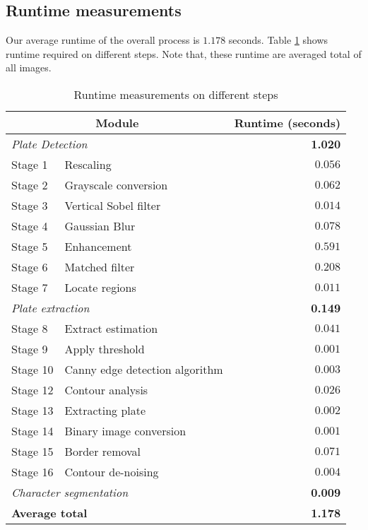 
\subsection{Runtime measurements}
Our average runtime of the overall process is $1.178$ seconds. Table \ref{table:Runtimes} shows runtime required on different steps. Note that, these runtime are averaged total of all images.


\begin{table}[!htb]
\centering
\caption{Runtime measurements on different steps}
\label{table:Runtimes}
\begin{tabular}{|l|l|r|}
\hline
\multicolumn{2}{|c|}{\bf Module}  & {\bf Runtime (seconds)} \\
\hline
\multicolumn{2}{|l|}{\it Plate Detection} & {\bf 1.020} \\ 
\hline
Stage 1 & Rescaling & $0.056$ \\
Stage 2 & Grayscale conversion & $0.062$ \\
Stage 3 & Vertical Sobel filter & $0.014$ \\
Stage 4 & Gaussian Blur & $0.078$ \\
Stage 5 & Enhancement & $0.591$ \\
Stage 6 & Matched filter & $0.208$ \\
Stage 7 & Locate regions & $0.011$ \\
\hline
\multicolumn{2}{|l|}{\it Plate extraction} & {\bf 0.149} \\ 
\hline
Stage 8 & Extract estimation & $0.041$ \\ 
Stage 9 & Apply threshold & $0.001$ \\ 
Stage 10 & Canny edge detection algorithm & $0.003$  \\ 
Stage 12 & Contour analysis & $0.026$ \\ 
Stage 13 & Extracting plate & $0.002$ \\ 
Stage 14 & Binary image conversion & $0.001$ \\ 
Stage 15 & Border removal & $0.071$ \\ 
Stage 16 & Contour de-noising & $0.004$ \\
\hline
\multicolumn{2}{|l|}{\it Character segmentation} & {\bf 0.009} \\ 
\hline
\multicolumn{2}{|l|}{\bf Average total} & {\bf 1.178} \\ 
\hline
\end{tabular}
\end{table} 


